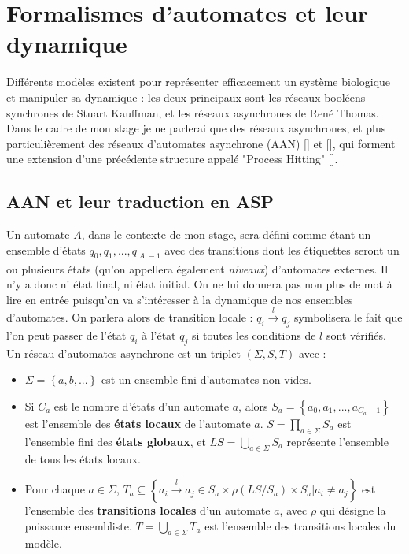 \documentclass[12pt,a4paper]{article}
\begin{document}
\section{Formalismes d'automates et leur dynamique}
Différents modèles existent pour représenter efficacement un système biologique et manipuler sa dynamique : les deux principaux sont les réseaux booléens synchrones de Stuart Kauffman, et les réseaux asynchrones de René Thomas.
Dans le cadre de mon stage je ne parlerai que des réseaux asynchrones, et plus particulièrement des réseaux d'automates asynchrone (AAN) [\cite{folschette2015sufficient}] et [\cite{pauleve2016pint}], qui forment une extension d'une précédente 
structure appelé "Process Hitting" [\cite{pauleve14}].\\

\subsection{AAN et leur traduction en ASP}
Un automate $A$, dans le contexte de mon stage, sera défini comme étant un ensemble d'états $q_0, q_1, ..., q_{|A|-1}$ avec des transitions dont les étiquettes seront un ou plusieurs états (qu'on appellera également \emph{niveaux}) 
d'automates externes. Il n'y a donc ni état final, ni état initial. On ne lui donnera pas non plus de mot à lire en entrée puisqu'on va s'intéresser à la dynamique de nos ensembles d'automates. On parlera alors de 
transition locale : $q_i\xrightarrow{l}q_j$ symbolisera le fait que l'on peut passer de l'état $q_i$ à l'état $q_j$ si toutes les conditions de $l$ sont vérifiés.\\
Un réseau d'automates asynchrone est un triplet $(\Sigma,S,T)$ avec :
\begin{itemize}
	\item $\Sigma=\left\{a,b,...\right\}$ est un ensemble fini d'automates non vides.
	\item Si $C_a$ est le nombre d'états d'un automate $a$, alors $S_a=\left\{a_0,a_1,...,a_{C_a-1}\right\}$ est l'ensemble des \textbf{états locaux} de l'automate $a$. $S=\displaystyle{\prod_{a\in\Sigma}}S_a$ est l'ensemble 
	fini des \textbf{états globaux}, et $LS=\displaystyle{\bigcup_{a\in\Sigma}}S_a$ représente l'ensemble de tous les états locaux.
	\item Pour chaque $a\in\Sigma$, $T_a\subseteq\left\{a_i\xrightarrow{l}a_j\in S_a\times\rho(LS/S_a)\times S_a|a_i\neq a_j\right\}$ est l'ensemble des \textbf{transitions locales} d'un automate $a$, avec 
	$\rho$ qui désigne la puissance ensembliste. $T=\displaystyle{\bigcup_{a\in\Sigma}}T_a$ est l'ensemble des transitions locales du modèle.\\ \\
\end{itemize}
\end{document}
